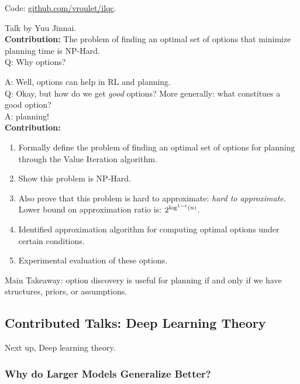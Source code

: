 Code: \url{github.com/vroulet/ilqc}.




Talk by Yuu Jinnai. \\

{\bf Contribution:} The problem of finding an optimal set of options that minimize planning time is NP-Hard. \\

Q: Why options?

A: Well, options can help in RL and planning. \\

Q: Okay, but how do we get {\it good} options? More generally: what constitues a good option? \\

A: planning! \\

{\bf Contribution:}
\begin{enumerate}
    \item Formally define the problem of finding an optimal set of options for planning through the Value Iteration algorithm.
    \item Show this problem is NP-Hard.
    \item Also prove that this problem is hard to approximate: {\it hard to approximate}. Lower bound on approximation ratio is: $2^{\log^{1-\varepsilon}(n)}$.
    \item Identified approximation algorithm for computing optimal options under certain conditions.
    \item Experimental evaluation of these options.
\end{enumerate}

Main Takeaway: option discovery is useful for planning if and only if we have structures, priors, or assumptions.

\spacerule


\subsection{Contributed Talks: Deep Learning Theory}

Next up, Deep learning theory.

\subsubsection{Why do Larger Models Generalize Better?~\cite{brutzkus2019larger}}


